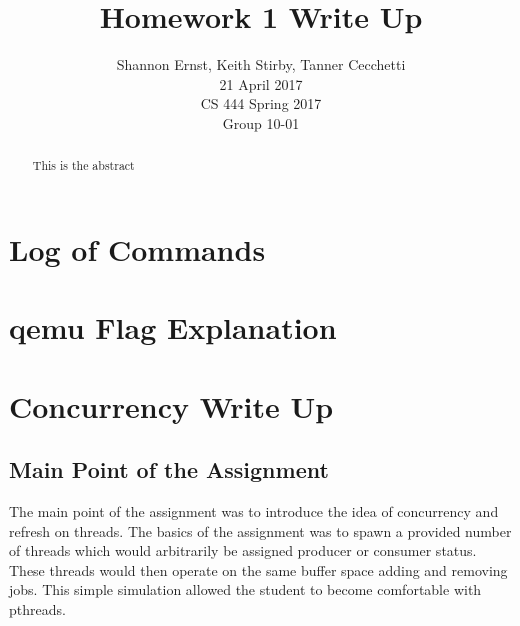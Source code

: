 \documentclass[letterpaper,10pt,serif,draftclsnofoot,onecolumn,compsoc,titlepage]{article}%
\title{Homework 1 Write Up}
\author{Shannon Ernst, Keith Stirby, Tanner Cecchetti \\ 21 April 2017 \\ CS 444 Spring 2017 \\ Group 10-01}
\begin{document}
\maketitle
\begin{abstract}
This is the abstract
\end{abstract}
\newpage
\section{Log of Commands}
\section{qemu Flag Explanation}
\section{Concurrency Write Up}
\subsection{Main Point of the Assignment}
The main point of the assignment was to introduce the idea of
concurrency and refresh on threads. The basics of the assignment was
to spawn a provided number of threads which would arbitrarily be assigned
 producer or consumer status. These threads would then operate on the same
 buffer space adding and removing jobs. This simple simulation allowed
 the student to become comfortable with pthreads.
\end{document}
